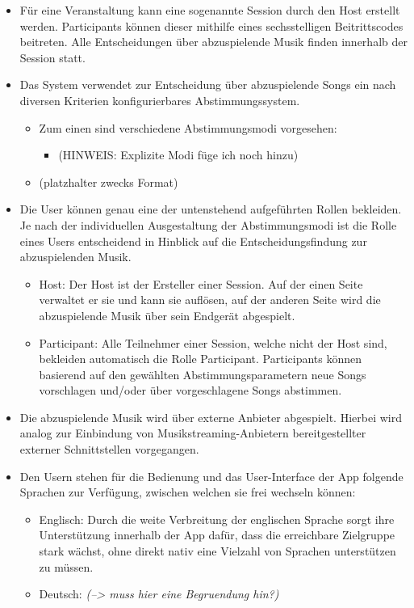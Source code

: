 \documentclass[oneside, ngerman]{sdqtechreport}
\begin{document}
\begin{itemize}
\begin{itemize}
        \end{itemize}
    \item Für eine Veranstaltung kann eine sogenannte Session durch den Host erstellt werden. Participants können dieser mithilfe eines sechsstelligen Beitrittscodes beitreten. Alle Entscheidungen über abzuspielende Musik finden innerhalb der Session statt.
    \item Das System verwendet zur Entscheidung über abzuspielende Songs ein nach diversen Kriterien konfigurierbares Abstimmungssystem.
    \begin{itemize}
        \item Zum einen sind verschiedene Abstimmungsmodi vorgesehen:
        \begin{itemize}
            \item (HINWEIS: Explizite Modi füge ich noch hinzu)
        \end{itemize}
        \item  (platzhalter zwecks Format)
    \end{itemize}
    \item Die User können genau eine der untenstehend aufgeführten Rollen bekleiden. Je nach der individuellen Ausgestaltung der Abstimmungsmodi ist die Rolle eines Users entscheidend in Hinblick auf die Entscheidungsfindung zur abzuspielenden Musik.
    \begin{itemize}
        \item Host: Der Host ist der Ersteller einer Session. Auf der einen Seite verwaltet er sie und kann sie auflösen, auf der anderen Seite wird die abzuspielende Musik über sein Endgerät abgespielt.
        \item Participant: Alle Teilnehmer einer Session, welche nicht der Host sind, bekleiden automatisch die Rolle Participant. Participants können basierend auf den gewählten Abstimmungsparametern neue Songs vorschlagen und/oder über vorgeschlagene Songs abstimmen. 
    \end{itemize}
    \item Die abzuspielende Musik wird über externe Anbieter abgespielt. Hierbei wird analog zur Einbindung von Musikstreaming-Anbietern bereitgestellter externer Schnittstellen vorgegangen.
    \item  Den Usern stehen für die Bedienung und das User-Interface der App folgende Sprachen zur Verfügung, zwischen welchen sie frei wechseln können:
    \begin{itemize}
        \item Englisch: Durch die weite Verbreitung der englischen Sprache sorgt ihre Unterstützung innerhalb der App dafür, dass die erreichbare Zielgruppe stark wächst, ohne direkt nativ eine Vielzahl von Sprachen unterstützen zu müssen.
        \item Deutsch: \textit{(--> muss hier eine Begruendung hin?)}
    \end{itemize}
\end{itemize}
\end{document}
